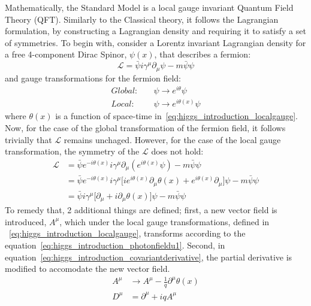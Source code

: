 Mathematically, the Standard Model is a local gauge invariant Quantum Field Theory (QFT). Similarly to the Classical theory, it follows the Lagrangian formulation, by constructing a Lagrangian density and requiring it to satisfy a set of symmetries. To begin with, consider a Lorentz invariant Lagrangian density for a free 4-component Dirac Spinor, $\psi(x)$, that describes a fermion:
\begin{equation}
    \label{eq:higgs_introduction_diracLagrangian}
    \mathcal{L} = \bar{\psi}i\gamma^{\mu}\partial_{\mu}\psi - m\bar{\psi}\psi
\end{equation}
and gauge transformations for the fermion field:
\begin{subequations}\label{grp}
\begin{align}
    Global:&\quad \psi \rightarrow e^{i\theta}\psi\\
    Local:&\quad \psi \rightarrow e^{i\theta(x)}\psi\label{eq:higgs_introduction_localgauge}
\end{align}
\end{subequations}
where $\theta(x)$ is a function of space-time in~\ref{eq:higgs_introduction_localgauge}. Now, for the case of the global transformation of the fermion field, it follows trivially that $\mathcal{L}$ remains unchaged. However, for the case of the local gauge transformation, the symmetry of the $\mathcal{L}$ does not hold:
\begin{equation}\label{eq:higgs_introduction_diraclocalgauge}
    \begin{split}
    \mathcal{L}& = \bar{\psi}e^{-i\theta(x)}i\gamma^{\mu}\partial_{\mu}(e^{i\theta(x)}\psi) - m\bar{\psi}\psi\\
    & = \bar{\psi}e^{-i\theta(x)}i\gamma^{\mu} \lbrack ie^{i\theta(x)}\partial_{\mu}\theta(x) + e^{i\theta(x)}\partial_{\mu} \rbrack \psi - m\bar{\psi}\psi\\
    & = \bar{\psi}i\gamma^{\mu} \lbrack \partial_{\mu} + i\partial_{\mu}\theta(x) \rbrack \psi - m\bar{\psi}\psi
    \end{split}
\end{equation}
To remedy that, 2 additional things are defined; first, a new vector field is introduced, $A^{\mu}$, which under the local gauge transformations, defined in ~\ref{eq:higgs_introduction_localgauge}, transforms according to the equation~\ref{eq:higgs_introduction_photonfieldu1}. Second, in equation~\ref{eq:higgs_introduction_covariantderivative}, the partial derivative is modified to accomodate the new vector field.
\begin{subequations}\label{eq:higgs_introduction_qedgauge}
\begin{align}
    A^{\mu}& \rightarrow A^{\mu} - \frac{1}{q}\partial^{\mu}\theta(x)\label{eq:higgs_introduction_photonfieldu1}\\
    D^{\mu}& = \partial^{\mu} + iqA^{\mu}\label{eq:higgs_introduction_covariantderivative}
\end{align}
\end{subequations}
